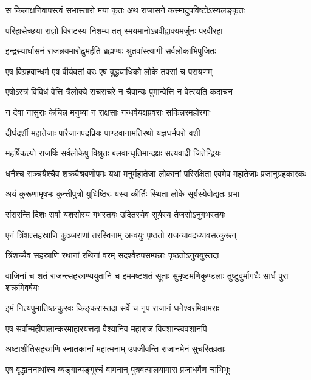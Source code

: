 \twolineshloka
{स किलाक्षनिवापस्त्वं सभास्तारो मया कृतः}
{अथ राजासने कस्मादुपविष्टोऽस्यलङ्कृतः}



\twolineshloka
{परिहासेच्छया राज्ञो विराटस्य निशम्य तत्}
{स्मयमानोऽब्रवीद्वाक्यमर्जुनः परवीरहा}


\twolineshloka
{इन्द्रस्यार्धासनं राजन्नयमारोढुमर्हति}
{ब्रह्मण्यः श्रुतवांस्त्यागी सर्वलोकाभिपूजितः}


\twolineshloka
{एष विग्रहवान्धर्म एष वीर्यवतां वरः}
{एष बुद्ध्याधिको लोके तपसां च परायणम्}


\twolineshloka
{एषोऽस्त्रं विविधं वेत्ति त्रैलोक्ये सचराचरे}
{न चैवान्यः पुमान्वेत्ति न वेत्स्यति कदाचन}


\twolineshloka
{न देवा नासुराः केचिन्न मनुष्या न राक्षसाः}
{गन्धर्वयक्षप्रवराः सकिन्नरमहोरगाः}


\twolineshloka
{दीर्घदर्शी महातेजाः पारैजानपदप्रियः}
{पाण्डवानामतिरथो यज्ञधर्मपरो वशी}


\twolineshloka
{महर्षिकल्पो राजर्षिः सर्वलोकेषु विश्रुतः}
{बलवान्धृतिमान्दक्षः सत्यवादी जितेन्द्रियः}


\threelineshloka
{धनैश्च सञ्चयैश्चैव शक्रवैश्रवणोपमः}
{यथा मनुर्महातेजा लोकानां परिरक्षिता}
{एवमेव महातेजाः प्रजानुग्रहकारकः}


\twolineshloka
{अयं कुरूणामृषभः कुन्तीपुत्रो युधिष्ठिरः}
{यस्य कीर्तिः स्थिता लोके सूर्यस्येवोद्यतः प्रभा}


\twolineshloka
{संसरन्ति दिशः सर्वा यशसोस्य गभस्तयः}
{उदितस्येव सूर्यस्य तेजसोऽनुगभस्तयः}


\twolineshloka
{एनं त्रिंशत्सहस्राणि कुञ्जराणां तरस्विनाम्}
{अन्वयुः पृष्ठतो राजन्यावदध्यावसत्कुरून्}


\twolineshloka
{त्रिंशच्चैव सहस्राणि रथानां रथिनां वरम्}
{सदश्वैरुपसम्पन्नाः पृष्ठतोऽनुययुस्तदा}


\threelineshloka
{वाजिनां च शतं राजन्त्सहस्राण्ययुतानि च}
{इममष्टशतं सूताः सुमृष्टमणिकुण्डलाः}
{तुष्टुवुर्मागधैः सार्धं पुरा शक्रमिवर्षयः}


\twolineshloka
{इमं नित्यपुमातिष्ठन्कुरवः किङ्करास्तदा}
{सर्वे च नृप राजानं धनेश्वरमिवामराः}


\twolineshloka
{एष सर्वान्महीपालान्करमाहारयत्तदा}
{वैश्यानिव महाराज विवशान्स्ववशानपि}


\twolineshloka
{अष्टाशीतिसहस्राणि स्नातकानां महात्मनाम्}
{उपजीवन्ति राजानमेनं सुचरितव्रताः}


\twolineshloka
{एष वृद्धाननाथांश्च व्यङ्गान्पङ्गूश्चं वामनान्}
{पुत्रवत्पालयामास प्रजाधर्मेण चाभिभूः}


